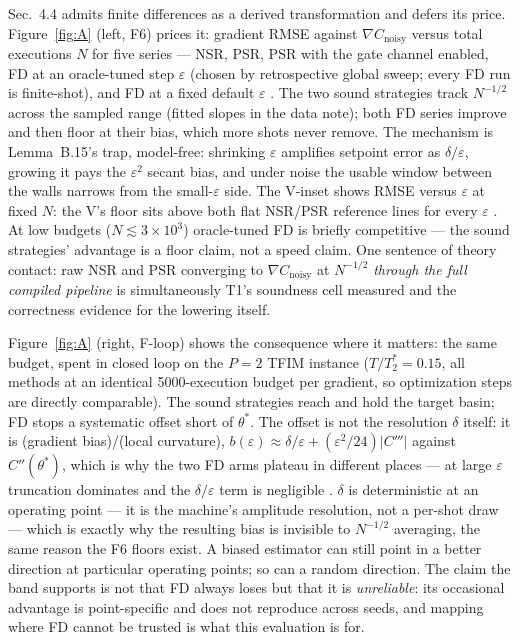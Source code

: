 Sec.~4.4 admits finite differences as a derived transformation and defers
its price. Figure~\ref{fig:A} (left, F6) prices it: gradient RMSE against
$\nabla C_{\mathrm{noisy}}$ versus total executions $N$ for five series ---
NSR, PSR, PSR with the gate channel enabled, FD at an oracle-tuned step
$\varepsilon$ (chosen by retrospective global sweep; every FD run is
finite-shot), and FD at a fixed default $\varepsilon$
. The two sound strategies track
$N^{-1/2}$ across the sampled range (fitted slopes in the data note); both
FD series improve and then floor at their bias, which more shots never
remove. The mechanism is Lemma~B.15's trap, model-free: shrinking
$\varepsilon$ amplifies setpoint error as $\delta/\varepsilon$, growing it
pays the $\varepsilon^{2}$ secant bias, and under noise the usable window
between the walls narrows from the small-$\varepsilon$ side. The V-inset
shows RMSE versus $\varepsilon$ at fixed $N$: the V's floor sits above
both flat NSR/PSR reference lines for every $\varepsilon$
. At low budgets
($N\lesssim3{\times}10^{3}$) oracle-tuned FD is briefly competitive ---
the sound strategies' advantage is a floor claim, not a speed claim. One
sentence of theory contact: raw NSR and PSR converging to
$\nabla C_{\mathrm{noisy}}$ at $N^{-1/2}$ \emph{through the full compiled
pipeline} is simultaneously T1's soundness cell measured and the
correctness evidence for the lowering itself.

Figure~\ref{fig:A} (right, F-loop) shows the consequence where it matters:
the same budget, spent in closed loop on the $P{=}2$ TFIM instance
($T/T_2^{*}=0.15$, all methods at an identical 5000-execution budget per
gradient, so optimization steps are directly comparable). The sound
strategies reach and hold the target basin; FD stops a systematic offset
short of $\theta^{*}$. The offset is not the resolution $\delta$ itself:
it is (gradient bias)/(local curvature), $b(\varepsilon)\approx
\delta/\varepsilon+(\varepsilon^{2}/24)\lvert C'''\rvert$ against
$C''(\theta^{*})$, which is why the two FD arms plateau in different
places --- at large $\varepsilon$ truncation dominates and the
$\delta/\varepsilon$ term is negligible .
$\delta$ is deterministic at an operating point --- it is the machine's
amplitude resolution, not a per-shot draw --- which is exactly why the
resulting bias is invisible to $N^{-1/2}$ averaging, the same reason the
F6 floors exist. A biased estimator can still point in a better direction
at particular operating points; so can a random direction. The claim the
band supports is not that FD always loses but that it is
\emph{unreliable}: its occasional advantage is point-specific and does not
reproduce across seeds, and mapping where FD cannot be trusted is what
this evaluation is for.

